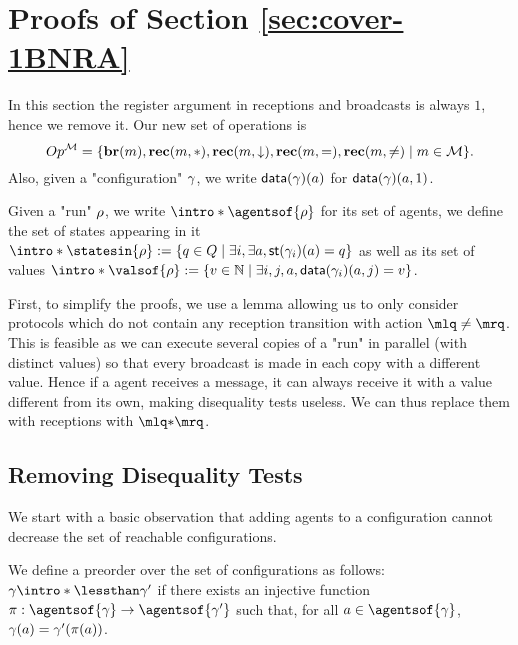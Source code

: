
\section{Proofs of Section \ref{sec:cover-1BNRA}}
\label{app:cover-one-reg}

In this section the register argument in receptions and broadcasts is always $1$, hence we remove it.
Our new set of operations is 
\[
Op^{\mathcal{M}} = \{\textbf{br}(m), \textbf{rec}(m, {*}), \textbf{rec}(m, \downarrow), \textbf{rec}(m, {=}), \textbf{rec}(m, {\ne}) \mid m \in \mathcal{M}\}.
\]
Also, given a "configuration" $\gamma$, we write $\mathsf{data}(\gamma)(a)$ for $\mathsf{data}(\gamma)(a,1)$. 

Given a "run" $\rho$, we write $\intro*\agentsof{\run}$ for its set of agents, we define the set of states appearing in it $\intro*\statesin{\run}:= \set{q \in Q \mid \exists i, \exists a, \st{\config_i}(a) = q}$  as well as its set of values $\intro*\valsof{\run} := \set{\aval \in \nats \mid \exists i,j, a, \data{\config_i}(a,j) = \aval}$.  

First, to simplify the proofs, we use a lemma allowing us to only consider protocols which do not contain any reception transition with action $\quotemarks{\ne}$. This is feasible as we can execute several copies of a "run" in parallel (with distinct values) so that every broadcast is made in each copy with a different value. Hence if a agent receives a message, it can always receive it with a value different from its own, making disequality tests useless. We can thus replace them with receptions with $\quotemarks{\dummyact}$. 




\subsection{Removing Disequality Tests}
\label{sec:one-diseq-tests}

We start with a basic observation that adding agents to a configuration cannot decrease the set of reachable configurations.


\begin{definition}
	We define a preorder over the set of configurations as follows: $\config \intro*\lessthan \config'$ if there exists an injective function $\pi: \agentsof{\config} \rightarrow \agentsof{\config'}$ such that, for all $a \in \agentsof{\config}$, $\gamma(a) = \gamma'(\pi(a))$. 
\end{definition}

